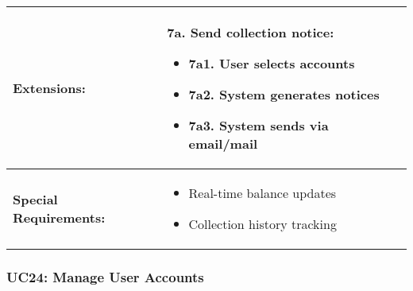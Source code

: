 \documentclass[12pt]{article}
\begin{document}
\begin{tabular}{|p{3cm}|p{11cm}|}
\hline
\textbf{Extensions:} & 
\textbf{7a. Send collection notice:}
\begin{itemize}
    \item 7a1. User selects accounts
    \item 7a2. System generates notices
    \item 7a3. System sends via email/mail
\end{itemize} \\
\hline
\textbf{Special Requirements:} & 
\begin{itemize}
    \item Real-time balance updates
    \item Collection history tracking
\end{itemize} \\
\hline
\end{tabular}


\subsubsection{UC24: Manage User Accounts}
\end{document}
